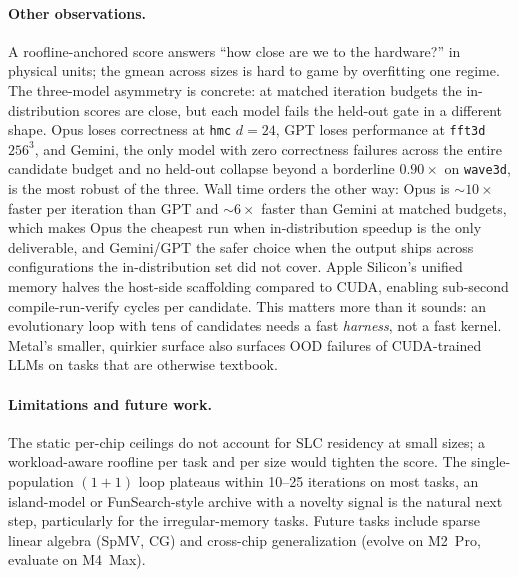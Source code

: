 \documentclass{article}
\theoremstyle{plain}
\theoremstyle{definition}
\theoremstyle{remark}
\begin{document}
\paragraph{Other observations.}
A roofline-anchored score answers ``how close are we to the
hardware?'' in physical units; the gmean across sizes is hard to
game by overfitting one regime. The three-model asymmetry is
concrete: at matched iteration budgets the in-distribution scores
are close, but each model fails the held-out gate in a different
shape. Opus loses correctness at \texttt{hmc} $d{=}24$, GPT loses
performance at \texttt{fft3d} $256^3$, and Gemini, the only model with
zero correctness failures across the entire candidate budget
and no held-out collapse beyond a borderline $0.90\times$ on
\texttt{wave3d}, is the most robust of the three. Wall time orders the
other way: Opus is $\sim 10\times$ faster per iteration than
GPT and $\sim 6\times$ faster than Gemini at matched budgets,
which makes Opus the cheapest run when in-distribution speedup is
the only deliverable, and Gemini/GPT the safer choice when the
output ships across configurations the in-distribution set did not cover.
Apple Silicon's unified memory halves the host-side scaffolding
compared to CUDA, enabling sub-second compile-run-verify cycles per
candidate. This matters more than it sounds: an evolutionary
loop with tens of candidates needs a fast \emph{harness}, not a
fast kernel. Metal's smaller, quirkier surface also surfaces OOD
failures of CUDA-trained LLMs on tasks that are otherwise textbook.

\paragraph{Limitations and future work.} The static per-chip ceilings do not
account for SLC residency at small sizes;
a workload-aware roofline \cite{williams2009roofline} per task and per size would tighten the score.
The single-population $(1{+}1)$ loop plateaus within 10--25 iterations on
most tasks, an island-model or FunSearch-style \cite{funsearch} archive with a novelty
signal \cite{novikov2025alphaevolve} is the natural next step, particularly for the irregular-memory
tasks. Future tasks include sparse linear algebra (SpMV, CG) and
cross-chip generalization (evolve on M2~Pro, evaluate on M4~Max).







\newpage
\appendix
\onecolumn
\end{document}

